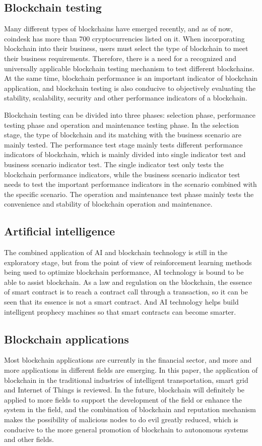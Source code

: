\documentclass[lettersize,journal]{IEEEtran}
\begin{document}
\subsection{Blockchain testing}
Many different types of blockchains have emerged recently, and as of now, coindesk has more than 700 cryptocurrencies listed on it. When incorporating blockchain into their business, users must select the type of blockchain to meet their business requirements. Therefore, there is a need for a recognized and universally applicable blockchain testing mechanism to test different blockchains. At the same time, blockchain performance is an important indicator of blockchain application, and blockchain testing is also conducive to objectively evaluating the stability, scalability, security and other performance indicators of a blockchain.

Blockchain testing can be divided into three phases: selection phase, performance testing phase and operation and maintenance testing phase. In the selection stage, the type of blockchain and its matching with the business scenario are mainly tested. The performance test stage mainly tests different performance indicators of blockchain, which is mainly divided into single indicator test and business scenario indicator test. The single indicator test only tests the blockchain performance indicators, while the business scenario indicator test needs to test the important performance indicators in the scenario combined with the specific scenario. The operation and maintenance test phase mainly tests the convenience and stability of blockchain operation and maintenance.
\subsection{Artificial intelligence}
The combined application of AI and blockchain technology is still in the exploratory stage, but from the point of view of reinforcement learning methods being used to optimize blockchain performance, AI technology is bound to be able to assist blockchain. As a law and regulation on the blockchain, the essence of smart contract is to reach a contract call through a transaction, so it can be seen that its essence is not a smart contract. And AI technology helps build intelligent prophecy machines so that smart contracts can become smarter.
\subsection{Blockchain applications}
Most blockchain applications are currently in the financial sector, and more and more applications in different fields are emerging. In this paper, the application of blockchain in the traditional industries of intelligent transportation, smart grid and Internet of Things is reviewed. In the future, blockchain will definitely be applied to more fields to support the development of the field or enhance the system in the field, and the combination of blockchain and reputation mechanism makes the possibility of malicious nodes to do evil greatly reduced, which is conducive to the more general promotion of blockchain to autonomous systems and other fields.
\end{document}
